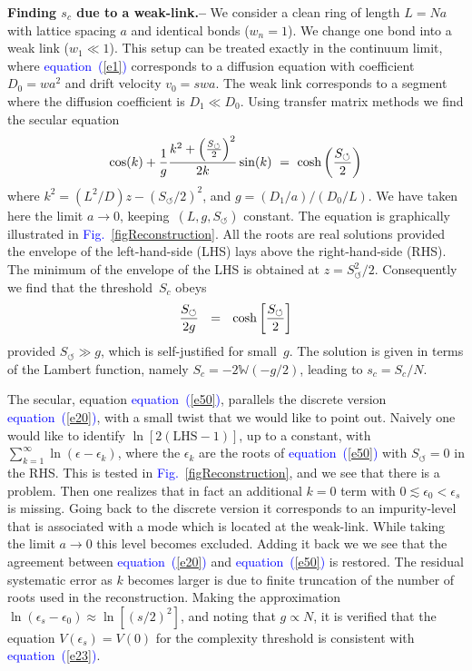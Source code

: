 \documentclass[aps,pre,floats,floatfix,twocolumn]{revtex4}
\newcommand{\be}[1]{\begin{eqnarray}\ifthenelse{#1=-1}{\nonumber}{\ifthenelse{#1=0}{}{\label{e#1}}}}
\newcommand{\eeq}{\end{eqnarray}}
\newcommand{\Eq}[1]{\textcolor{blue}{{equation}\!~(\ref{#1})}}
\newcommand{\Fig}[1]{\textcolor{blue}{Fig.}\!\!~\ref{#1}}
\newcommand{\sect}[1]{{\bf #1.-- }}
\newcommand{\rmrk}[1]{{\color[rgb]{0.6,0,0.1} #1}}
\begin{document}
\sect{Finding $s_c$ due to a weak-link}
%
We consider a clean ring of length ${L=Na}$ with lattice spacing $a$ 
and identical bonds (${w_n=1}$).  
We change one bond into a weak link (${w_1 \ll 1}$). 
This setup can be treated exactly in the continuum limit, 
where \Eq{e1} corresponds to a diffusion equation  
with coefficient ${D_0=wa^2}$ and drift velocity ${v_0=swa}$.  
The weak link corresponds to a segment 
where the diffusion coefficient is ${D_1 \ll D_0}$.  
Using transfer matrix methods we find the secular equation 
%
\be{50}
\cos(k) + \frac{1}{g} \frac{k^2+\left(\frac{S_{\circlearrowleft}}{2}\right)^2}{2k}\sin(k)
\ = \ \cosh \left(\frac{S_{\circlearrowleft}}{2} \right)
\eeq
%
where ${k^2= (L^2/D) z - (S_{\circlearrowleft}/2)^2}$, 
and $g=(D_1/a)/(D_0/L)$. We have taken here 
the limit ${a\rightarrow0}$, keeping~$(L,g,S_{\circlearrowleft})$ constant. 
The equation is graphically illustrated in \Fig{figReconstruction}. 
All the roots are real solutions provided the envelope 
of the left-hand-side (LHS) lays above the right-hand-side (RHS).
The minimum of the envelope of the LHS is obtained at ${z = S_{\circlearrowleft}^2/2}$.
Consequently we find that the threshold~$S_c$ obeys 
%
\be{23}
\frac{S_{\circlearrowleft}}{2g} \ \ = \ \ \cosh\left[ \frac{S_{\circlearrowleft}}{2} \right]
\eeq
%
provided $S_{\circlearrowleft} \gg g$, which is self-justified for small~$g$.   
The solution is given in terms of the Lambert function, 
namely ${S_c = -2 \mathbb{W}(-g/2)}$, leading to ${s_c=S_c/N}$.

 
The secular, equation \Eq{e50}, parallels the discrete version \Eq{e20}, 
with a small twist that we would like to point out.
Naively one would like to identify $\ln [2 (\text{LHS} -1)]$, 
up to a constant, with $\sum_{k=1}^{\infty} \ln(\epsilon-\epsilon_k)$, 
where the $\epsilon_k$ are the roots of \Eq{e50} with $S_{\circlearrowleft}{=}0$ 
in the RHS. This is tested in \Fig{figReconstruction}, 
and we see that there is a problem. Then one realizes 
that in fact an additional $k=0$ term with ${0 \lesssim \epsilon_0 < \epsilon_s}$ 
is missing. Going back to the discrete version it corresponds 
to an impurity-level that is associated with a mode which is located 
at the weak-link.
While taking the limit ${a\rightarrow0}$ this level becomes excluded.
Adding it back we we see that the agreement between \Eq{e20}      
and \Eq{e50} is restored. The residual systematic error as $k$ becomes 
larger is due to finite truncation \rmrk{of the number of roots used in the reconstruction}. 
%
Making the approximation ${\ln(\epsilon_s-\epsilon_0) \approx \ln[(s/2)^2]}$,  
and noting that ${g\propto N}$, it is verified that the 
equation  ${V(\epsilon_s) = V(0)}$  for the complexity threshold 
is consistent with \Eq{e23}. 
\end{document}
